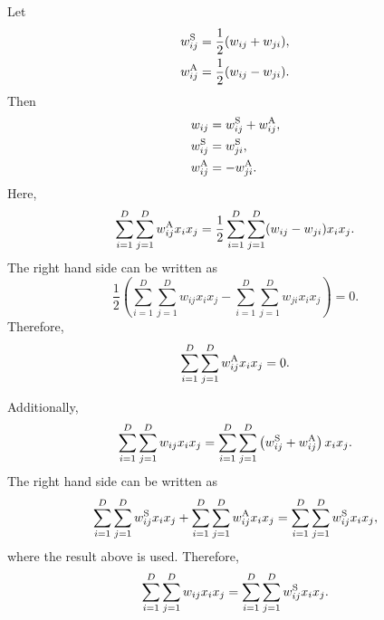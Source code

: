 \subsection{}
\label{1.14}
Let
%
\begin{equation}
\begin{aligned}
w_{ij}^{\rm S} 
&= 
\frac{1}{2} 
(w_{ij} 
+ 
w_{ji}), \\
w_{ij}^{\rm A} 
&= 
\frac{1}{2} 
(w_{ij}
 -
  w_{ji}).
\end{aligned}
\end{equation}
%
Then
%
\begin{equation}
\begin{aligned}
w_{ij} 
&= 
w_{ij}^{\rm S} 
+ 
w_{ij}^{\rm A}, \\
w_{ij}^{\rm S} 
&=
w_{ji}^{\rm S}, \\
w_{ij}^{\rm A} 
&= 
- 
w_{ji}^{\rm A}.
\end{aligned}
\end{equation}
%
Here,
\begin{equation}
\sum_{i = 1}^{D} 
\sum_{j = 1}^{D} 
w_{ij}^{\rm A} 
x_i x_j 
= 
\frac{1}{2} 
\sum_{i = 1}^{D} 
\sum_{j = 1}^{D} 
(w_{ij} 
- 
w_{ji}) 
x_i x_j.
\end{equation}
%
The right hand side can be written as
%
\begin{equation}
\frac{1}{2} 
\left( 
	\sum_{i = 1}^{D} 
	\sum_{j = 1}^{D} 
	w_{ij} x_i x_j 
	- 
	\sum_{i = 1}^{D} 
	\sum_{j = 1}^{D} 
	w_{ji} x_i x_j 
\right) 
= 
0.
\end{equation}
%
Therefore, 
%
\begin{equation}
\sum_{i = 1}^{D} 
\sum_{j = 1}^{D} 
w_{ij}^{\rm A} x_i x_j 
= 
0.
\end{equation}
%

Additionally,
%
\begin{equation}
\sum_{i = 1}^{D} 
\sum_{j = 1}^{D} 
w_{ij} x_i x_j 
= 
\sum_{i = 1}^{D} 
\sum_{j = 1}^{D} 
\left( 
	w_{ij}^{\rm S} 
	+ 
	w_{ij}^{\rm A} 
\right) 
x_i x_j.
\end{equation}
%
The right hand side can be written as
%
\begin{equation}
\sum_{i = 1}^{D} 
\sum_{j = 1}^{D} 
w_{ij}^{\rm S} x_i x_j 
+ 
\sum_{i = 1}^{D} 
\sum_{j = 1}^{D} 
w_{ij}^{\rm A} x_i x_j 
= 
\sum_{i = 1}^{D} 
\sum_{j = 1}^{D} 
w_{ij}^{\rm S} x_i x_j,
\end{equation}
%
where the result above is used. 
Therefore,
%
\begin{equation}
\sum_{i = 1}^{D} 
\sum_{j = 1}^{D} 
w_{ij} x_i x_j 
= 
\sum_{i = 1}^{D} 
\sum_{j = 1}^{D} 
w_{ij}^{\rm S} x_i x_j.
\end{equation}
%


